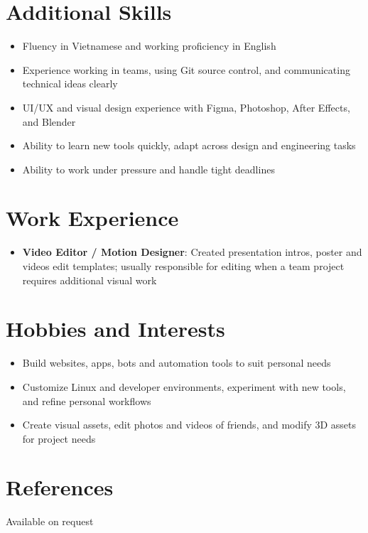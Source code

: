 \documentclass[letterpaper,11pt]{article}
\newcommand{\resumeItem}[2]{
  \item\small{
    \textbf{#1}{#2 \vspace{-2pt}}
  }
}
\newcommand{\resumeSubItem}[2]{\resumeItem{#1}{#2}\vspace{-4pt}}
\newcommand{\resumeSubHeadingListStart}{\begin{itemize}[leftmargin=*]}
\newcommand{\resumeSubHeadingListEnd}{\end{itemize}}
\newcommand{\resumeItemListStart}{\begin{itemize}}
\newcommand{\resumeItemListEnd}{\end{itemize}\vspace{-5pt}}
\begin{document}
\section{Additional Skills}
	\resumeItemListStart
		\resumeItem{}{Fluency in Vietnamese and working proficiency in English}
		\resumeItem{}{Experience working in teams, using Git source control, and communicating technical ideas clearly}
		\resumeItem{}{UI/UX and visual design experience with Figma, Photoshop, After Effects, and Blender}
		\resumeItem{}{Ability to learn new tools quickly, adapt across design and engineering tasks}
		\resumeItem{}{Ability to work under pressure and handle tight deadlines}
	\resumeItemListEnd

\section{Work Experience}
	\resumeSubHeadingListStart
		\resumeSubItem{Video Editor / Motion Designer}{: Created presentation intros, poster and videos edit templates; usually responsible for editing when a team project requires additional visual work}
	\resumeSubHeadingListEnd

\section{Hobbies and Interests}
	\resumeItemListStart
		\resumeItem{}{Build websites, apps, bots and automation tools to suit personal needs}
		\resumeItem{}{Customize Linux and developer environments, experiment with new tools, and refine personal workflows}
		\resumeItem{}{Create visual assets, edit photos and videos of friends, and modify 3D assets for project needs}
	\resumeItemListEnd

\section{References}
	Available on request

\end{document}
